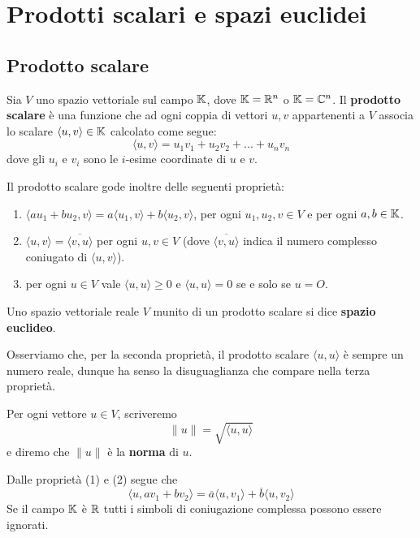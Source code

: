 \chapter{Prodotti scalari e spazi euclidei}
\section{Prodotto scalare}

\begin{definition}
	Sia $V$ uno spazio vettoriale sul campo $\mathbb{K}$, dove
	$\mathbb{K} = \mathbb{R}^n$ o $\mathbb{K} = \mathbb{C}^n$. Il
	\textbf{prodotto scalare} è una funzione che ad ogni coppia di vettori $u, v$
	appartenenti a $V$ associa lo scalare $\langle u, v \rangle \in \mathbb{K}$
	calcolato come segue:
	\[
		\langle u, v \rangle = u_1 v_1 + u_2 v_2 + ... + u_n v_n
	\]
	dove gli $u_i$ e $v_i$ sono le $i$-esime coordinate di $u$ e $v$.

	Il prodotto scalare gode inoltre delle seguenti proprietà:
	\begin{enumerate}
		\item $\langle au_1 + bu_2, v \rangle =
			      a \langle u_1, v \rangle + b \langle u_2, v \rangle$, per ogni
		      $u_1, u_2, v \in V$ e per ogni $a, b \in \mathbb{K}$.
		\item $\langle u, v \rangle = \overline{\langle v, u \rangle}$ per ogni
		      $u, v \in V$ (dove $\overline{\langle v, u \rangle}$ indica il numero
		      complesso coniugato di $\langle u, v \rangle$).
		\item per ogni $u \in V$ vale $\langle u, u \rangle \geq 0$ e
		      $\langle u, u \rangle = 0$ se e solo se $u = O$.
	\end{enumerate}
	Uno spazio vettoriale reale $V$ munito di un prodotto scalare si dice
	\textbf{spazio euclideo}.
\end{definition}

\begin{observation}
	Osserviamo che, per la seconda proprietà, il prodotto scalare
	$\langle u, u \rangle$ è sempre un numero reale, dunque ha senso la disuguaglianza
	che compare nella terza proprietà.
\end{observation}

\begin{definition}
	Per ogni vettore $u \in V$, scriveremo
	\[
		\| u \| = \sqrt{\langle u, u \rangle}
	\]
	e diremo che $\| u \|$ è la \textbf{norma} di $u$.
\end{definition}

\begin{observation}
	Dalle proprietà (1) e (2) segue che
	\[
		\langle u, av_1 + bv_2 \rangle =
		\overline{a} \langle u, v_1 \rangle + \overline{b} \langle u, v_2 \rangle
	\]
	Se il campo $\mathbb{K}$ è $\mathbb{R}$ tutti i simboli di coniugazione
	complessa possono essere ignorati.
\end{observation}


